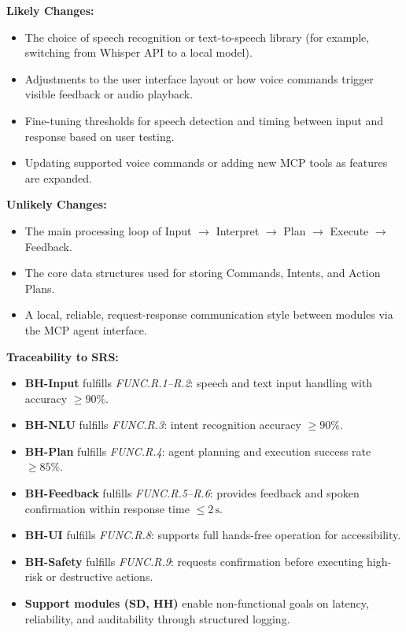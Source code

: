 \documentclass[12pt, titlepage]{article}
\begin{document}
\textbf{Likely Changes:}
\begin{itemize}
  \item The choice of speech recognition or text-to-speech library
  (for example, switching from Whisper API to a local model).
  \item Adjustments to the user interface layout or how voice commands
  trigger visible feedback or audio playback.
  \item Fine-tuning thresholds for speech detection and timing between
  input and response based on user testing.
  \item Updating supported voice commands or adding new MCP tools as
  features are expanded.
\end{itemize}

\textbf{Unlikely Changes:}
\begin{itemize}
  \item The main processing loop of Input $\rightarrow$ Interpret
  $\rightarrow$ Plan $\rightarrow$ Execute $\rightarrow$ Feedback.
  \item The core data structures used for storing Commands, Intents, and
  Action Plans.
  \item A local, reliable, request-response communication style between
  modules via the MCP agent interface.
\end{itemize}

\textbf{Traceability to SRS:}
\begin{itemize}
  \item \textbf{BH-Input} fulfills \textit{FUNC.R.1–R.2}: speech and text
  input handling with accuracy $\geq 90\%$.
  \item \textbf{BH-NLU} fulfills \textit{FUNC.R.3}: intent recognition
  accuracy $\geq 90\%$.
  \item \textbf{BH-Plan} fulfills \textit{FUNC.R.4}: agent planning and
  execution success rate $\geq 85\%$.
  \item \textbf{BH-Feedback} fulfills \textit{FUNC.R.5–R.6}: provides
  feedback and spoken confirmation within response time $\leq 2\,\text{s}$.
  \item \textbf{BH-UI} fulfills \textit{FUNC.R.8}: supports full hands-free
  operation for accessibility.
  \item \textbf{BH-Safety} fulfills \textit{FUNC.R.9}: requests confirmation
  before executing high-risk or destructive actions.
  \item \textbf{Support modules (SD, HH)} enable non-functional goals on
  latency, reliability, and auditability through structured logging.
\end{itemize}
\end{document}
